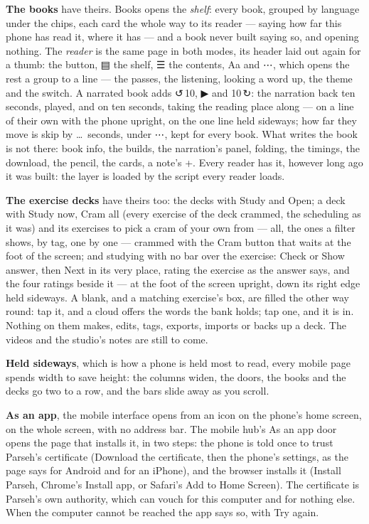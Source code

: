 \documentclass[11pt,oneside]{report}
\newcommand{\pw}[1]{\babelsublr{\mbox{\foreignlanguage{persian}{#1}}}}
\newcommand{\sym}[1]{{\symfont #1}}
\newcommand{\menu}[1]{\textsf{#1}}
\begin{document}
\textbf{The books} have theirs. \menu{Books} opens the \emph{shelf}: every
book, grouped by language under the chips, each card the whole way to its
reader --- saying how far this phone has read it, where it has --- and a book
never built saying so, and opening nothing. The \emph{reader} is the same
page in both modes, its header laid out again for a thumb: the \pw{پ}
button, \menu{\sym{▤}} the shelf, \menu{\sym{☰}} the contents, \menu{Aa} and
\menu{\sym{⋯}}, which opens the rest a group to a line --- the passes, the
listening, looking a word up, the theme and the switch. A narrated book adds
\menu{\sym{↺}\,10}, \menu{\sym{▶}} and \menu{10\,\sym{↻}}: the narration back
ten seconds, played, and on ten seconds, taking the reading place along ---
on a line of their own with the phone upright, on the one line held
sideways; how far they move is \menu{skip by \dots\ seconds}, under
\menu{\sym{⋯}}, kept for every book. What writes the book is not there: book
info, the builds, the narration's panel, folding, the timings, the download,
the pencil, the cards, a note's \menu{+}. Every reader has it, however long
ago it was built: the layer is loaded by the script every reader loads.

\textbf{The exercise decks} have theirs too: the decks with \menu{Study} and
\menu{Open}; a deck with \menu{Study now}, \menu{Cram all} (every exercise of
the deck crammed, the scheduling as it was) and its exercises to pick a cram
of your own from --- all, the ones a filter shows, by tag, one by one ---
crammed with the \menu{Cram} button that waits at the foot of the screen; and
studying with no bar over the exercise: \menu{Check} or \menu{Show answer},
then \menu{Next} in its very place, rating the exercise as the answer says,
and the four ratings beside it --- at the foot of the screen upright, down
its right edge held sideways. A blank, and a matching exercise's box, are
filled the other way round: tap it, and a cloud offers the words the bank
holds; tap one, and it is in. Nothing on them makes, edits, tags, exports,
imports or backs up a deck. The videos and the studio's notes are still to
come.

\textbf{Held sideways}, which is how a phone is held most to read, every
mobile page spends width to save height: the columns widen, the doors, the
books and the decks go two to a row, and the bars slide away as you scroll.

\textbf{As an app}, the mobile interface opens from an icon on the phone's
home screen, on the whole screen, with no address bar. The mobile hub's
\menu{As an app} door opens the page that installs it, in two steps: the
phone is told once to trust Parseh's certificate (\menu{Download the
certificate}, then the phone's settings, as the page says for Android and for
an iPhone), and the browser installs it (\menu{Install Parseh}, Chrome's
\menu{Install app}, or Safari's \menu{Add to Home Screen}). The certificate is
Parseh's own authority, which can vouch for this computer and for nothing
else. When the computer cannot be reached the app says so, with
\menu{Try again}.
\end{document}
